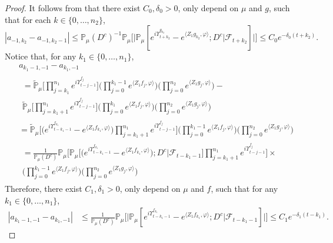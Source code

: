 \documentclass[12pt,a4paper]{amsart}
\theoremstyle{plain}
\theoremstyle{definition}
\numberwithin{equation}{section}
\begin{document}
\begin{proof}
It follows from {\color{red}\cite[Proposition 3.5]{RenSongSunZhao2019Stable}} that
  there exist $C_0,\delta_0 >0$, {\color{red} only depend on $\mu$ and $g$}, such that {\color{red} for each $k \in \{0, \dots, n_2 \}$,}
\begin{equation}
    | a_{-1,k_2} - a_{-1,k_2-1}|
    \leq \mathbb{P}_{\mu}(D^c)^{-1}\mathbb{P}_{\mu}\Big[\big|\mathbb P_\mu[e^{i\Upsilon^{g_{k_2}}_{t+k_2}}-e^{\langle Z_1g_{k_2}, \varphi\rangle}; D^c|\mathscr F_{t+k_2}]\big|\Big]
    \leq C_0 e^{-\delta_0 (t+k_2)}.
\end{equation}
{\color{red} 
	Notice that, for any $k_1 \in \{0, \dots , n_1\}$,
	\begin{align}
	&a_{k_1-1,-1} - a_{k_1,-1}
	\\ & \begin{multlined}
	=  \mathbb{\widetilde{P}}_{\mu}\Big[ \prod_{j=k_1}^{n_1} e^{i\Upsilon_{t-j-1}^{f_j}} \Big] \Big(\prod_{j=0}^{k_1-1}e^{\langle Z_1 f_j, \varphi\rangle}\Big) \Big(\prod_{j=0}^{n_2} e^{ \langle Z_1g_j,\varphi \rangle} \Big) - {}
	\\ \mathbb{\widetilde{P}}_{\mu}\Big[ \prod_{j=k_1+1}^{n_1} e^{i\Upsilon_{t-j-1}^{f_j}} \Big] \Big(\prod_{j=0}^{k_1}e^{\langle Z_1 f_j, \varphi\rangle}\Big) \Big(\prod_{j=0}^{n_2} e^{ \langle Z_1g_j,\varphi \rangle} \Big)
	\end{multlined}
	\\& =  \mathbb{\widetilde{P}}_{\mu}\Big[ \big(e^{i\Upsilon_{t-k_1-1}^{f_{k_1}}} -e^{\langle Z_1 f_{k_1}, \varphi\rangle} \big) \prod_{j=k_1+1}^{n_1} e^{i\Upsilon_{t-j-1}^{f_j}} \Big] \Big(\prod_{j=0}^{k_1-1}e^{\langle Z_1 f_j, \varphi\rangle}\Big) \Big(\prod_{j=0}^{n_2} e^{ \langle Z_1g_j,\varphi \rangle} \Big)
	\\& \begin{multlined}
	=  \frac{1}{\mathbb P_\mu(D^c)} \mathbb{P}_{\mu}\Big[ \mathbb P_\mu\big[\big(e^{i\Upsilon_{t-k_1-1}^{f_{k_1}}} -e^{\langle Z_1 f_{k_1}, \varphi\rangle} \big) ; D^c \big| \mathscr F_{t-k_1 - 1}\big] \prod_{j=k_1+1}^{n_1} e^{i\Upsilon_{t-j-1}^{f_j}} \Big] \times {}
	\\ \Big(\prod_{j=0}^{k_1-1}e^{\langle Z_1 f_j, \varphi\rangle}\Big) \Big(\prod_{j=0}^{n_2} e^{ \langle Z_1g_j,\varphi \rangle} \Big)
	\end{multlined}
	\end{align}
}
	Therefore,  there exist $C_1,\delta_1 >0$, {\color{red} only depend on $\mu$ and $f$, such that for any $k_1 \in \{0,\dots,n_1\}$,}
\begin{align}
    | a_{k_1-1,-1} - a_{k_1,-1}|
    & \leq \frac{1}{\mathbb{P}_{\mu}(D^c)}\mathbb{P}_{\mu}\Big[\big|\mathbb P_\mu[e^{i\Upsilon^{f_{k_1}}_{t-k_1-1}}-e^{\langle Z_1f_{k_1}, \varphi\rangle}; D^c|\mathscr F_{t-k_1-1}]\big|\Big]
    \leq C_1 e^{-\delta_1 (t-k_1)}.
\end{align}


\end{proof}
\end{document}
